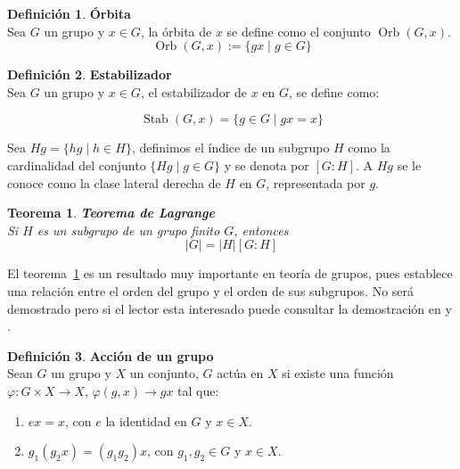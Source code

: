 \documentclass[12pt]{book}
\newtheorem{theorem}{Teorema}
\theoremstyle{definition}
\newtheorem{definition}{Definición}
\DeclareMathOperator{\Stab}{Stab}
\DeclareMathOperator{\orb}{Orb}
\begin{document}
\begin{definition}\textbf{Órbita}\\
  Sea $G$ un grupo y $x\in G$, la órbita de $x$ se define como el
  conjunto $\orb (G,x)$.
  \begin{equation*}
    \orb(G,x):=\{ gx \mid g\in G \}
  \end{equation*}
\end{definition}

\begin{definition}\textbf{Estabilizador}\\
  Sea $G$ un grupo y $x\in G$, el estabilizador de $x$ en $G$, se define
  como:

\begin{equation*}
  \Stab (G,x)=\{ g\in G \mid gx=x \}
\end{equation*}
\end{definition}

Sea $Hg=\{hg \mid h\in H\}$, definimos el índice de un subgrupo $H$ como la cardinalidad del conjunto $\{Hg
\mid g\in G \}$ y se denota por $[G:H]$. A $Hg$ se le conoce como la
clase lateral derecha de $H$ en $G$, representada por $g$.


\begin{theorem}\textbf{Teorema de Lagrange}\\
  Si $H$ es un subgrupo de un grupo finito $G$, entonces
$$|G|=|H|[G:H]$$
\label{TeoLagrange}
\end{theorem}

El teorema~\ref{TeoLagrange} es un resultado muy importante en teoría
de grupos, pues establece una relación entre el orden del grupo y el
orden de sus subgrupos. No ser\'a demostrado pero si el lector esta
interesado puede consultar la demostración en \cite{Barrera} y \cite{Ehrlich}.


\begin{definition}\textbf{Acción de un grupo}\\
  Sean $G$ un grupo y $X$ un conjunto, $G$ actúa en $X$ si existe una
  función $\varphi: G \times X \rightarrow X$, $\varphi (g,x)
  \rightarrow gx$ tal que:

  \begin{enumerate}
  \item $ex=x$, con $e$ la identidad en $G$ y $x\in X$.

  \item $g_1(g_2x)=(g_1g_2)x$, con $g_1,g_2 \in G$ y $x\in X$.
  \end{enumerate}
\end{definition}
\end{document}

